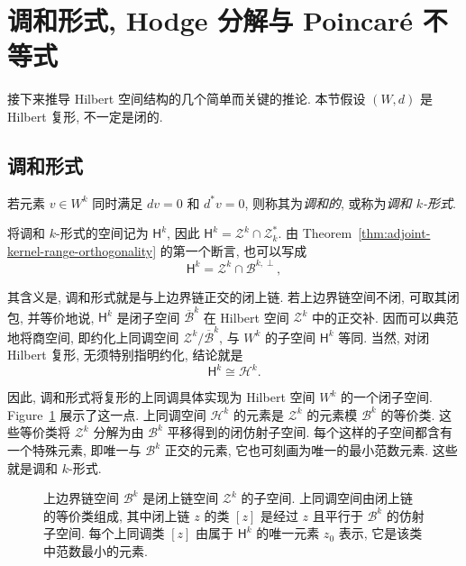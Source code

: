 \section{调和形式, Hodge 分解与 Poincaré 不等式}\label{sec:harmonic-hodge-poincare}

接下来推导 Hilbert 空间结构的几个简单而关键的推论. 本节假设 $(W,d)$ 是 Hilbert 复形, 不一定是闭的.

\subsection{调和形式}\label{subsec:harmonic-forms}

\begin{Definition}\label{def:harmonic-form}
若元素 $v\in W^k$ 同时满足 $dv=0$ 和 $d^*v=0$, 则称其为\emph{调和的}, 或称为\emph{调和 $k$-形式}.
\end{Definition}

将调和 $k$-形式的空间记为 $\mathsf H^k$, 因此 $\mathsf H^k=\mathcal Z^k\cap\mathcal Z_k^*$. 由 Theorem~\ref{thm:adjoint-kernel-range-orthogonality} 的第一个断言, 也可以写成
\begin{equation}\label{eq:harmonic-cocycle-orthogonality}
\mathsf H^k=\mathcal Z^k\cap\mathcal B^{k,\perp},
\end{equation}

其含义是, 调和形式就是与上边界链正交的闭上链. 若上边界链空间不闭, 可取其闭包, 并等价地说, $\mathsf H^k$ 是闭子空间 $\overline{\mathcal B}^k$ 在 Hilbert 空间 $\mathcal Z^k$ 中的正交补. 因而可以典范地将商空间, 即约化上同调空间 $\mathcal Z^k/\overline{\mathcal B}^k$, 与 $W^k$ 的子空间 $\mathsf H^k$ 等同. 当然, 对闭 Hilbert 复形, 无须特别指明约化, 结论就是
\begin{equation}\label{eq:harmonic-cohomology-isomorphism}
\mathsf H^k\cong\mathcal H^k.
\end{equation}

因此, 调和形式将复形的上同调具体实现为 Hilbert 空间 $W^k$ 的一个闭子空间. Figure~\ref{fig:cohomology-harmonic-representatives} 展示了这一点. 上同调空间 $\mathcal H^k$ 的元素是 $\mathcal Z^k$ 的元素模 $\mathcal B^k$ 的等价类. 这些等价类将 $\mathcal Z^k$ 分解为由 $\mathcal B^k$ 平移得到的闭仿射子空间. 每个这样的子空间都含有一个特殊元素, 即唯一与 $\mathcal B^k$ 正交的元素, 它也可刻画为唯一的最小范数元素. 这些就是调和 $k$-形式.

\begin{figure}[htbp]\centering

\caption{上边界链空间 $\mathcal B^k$ 是闭上链空间 $\mathcal Z^k$ 的子空间. 上同调空间由闭上链的等价类组成, 其中闭上链 $z$ 的类 $[z]$ 是经过 $z$ 且平行于 $\mathcal B^k$ 的仿射子空间. 每个上同调类 $[z]$ 由属于 $\mathsf H^k$ 的唯一元素 $z_0$ 表示, 它是该类中范数最小的元素.}\label{fig:cohomology-harmonic-representatives}
\end{figure}


